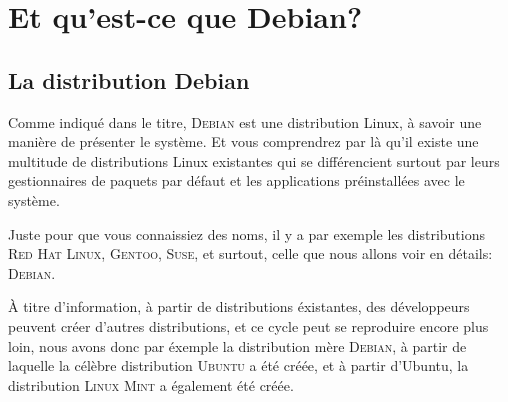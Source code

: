 \chapter{Et qu'est-ce que Debian?}

\section{La distribution Debian}

Comme indiqué dans le titre, \textsc{Debian} est une distribution Linux, à savoir
une manière de présenter le système. Et vous comprendrez par là qu'il existe
une multitude de distributions Linux existantes qui se différencient surtout
par leurs gestionnaires de paquets par défaut et les applications préinstallées
avec le système.

Juste pour que vous connaissiez des noms, il y a par exemple les distributions
\textsc{Red Hat Linux}, \textsc{Gentoo}, \textsc{Suse}, et surtout, celle que
nous allons voir en détails: \textsc{Debian}.

À titre d'information, à partir de distributions éxistantes, des développeurs
peuvent créer d'autres distributions, et ce cycle peut se reproduire encore
plus loin, nous avons donc par éxemple la distribution mère \textsc{Debian},
à partir de laquelle la célèbre distribution \textsc{Ubuntu} a été créée, et
à partir d'Ubuntu, la distribution \textsc{Linux Mint} a également été créée.
